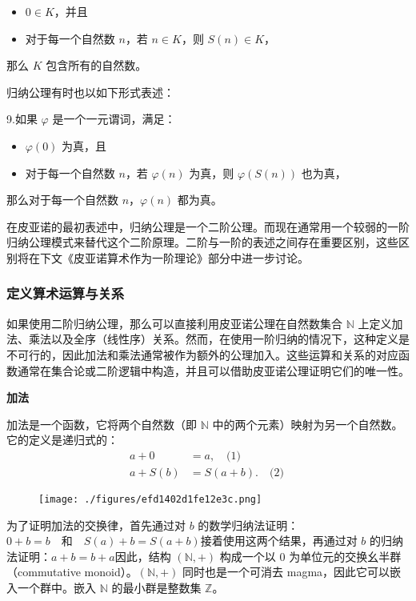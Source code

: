 \begin{itemize}
\item $0 \in K$，并且
\item 对于每一个自然数 $n$，若 $n \in K$，则 $S(n) \in K$，
\end{itemize}

那么 $K$ 包含所有的自然数。

归纳公理有时也以如下形式表述：

9.如果 $\varphi$ 是一个一元谓词，满足：

\begin{itemize}
\item $\varphi(0)$ 为真，且
\item 对于每一个自然数 $n$，若 $\varphi(n)$ 为真，则 $\varphi(S(n))$ 也为真，
\end{itemize}
那么对于每一个自然数 $n$，$\varphi(n)$ 都为真。

在皮亚诺的最初表述中，归纳公理是一个二阶公理。而现在通常用一个较弱的一阶归纳公理模式来替代这个二阶原理。二阶与一阶的表述之间存在重要区别，这些区别将在下文《皮亚诺算术作为一阶理论》部分中进一步讨论。
\subsubsection{定义算术运算与关系}
如果使用二阶归纳公理，那么可以直接利用皮亚诺公理在自然数集合 $\mathbb{N}$ 上定义加法、乘法以及全序（线性序）关系。然而，在使用一阶归纳的情况下，这种定义是不可行的，因此加法和乘法通常被作为额外的公理加入。这些运算和关系的对应函数通常在集合论或二阶逻辑中构造，并且可以借助皮亚诺公理证明它们的唯一性。

\textbf{加法}

加法是一个函数，它将两个自然数（即 $\mathbb{N}$ 中的两个元素）映射为另一个自然数。它的定义是递归式的：
$$
\begin{aligned}
a + 0 &= a, \quad \text{(1)} \\
a + S(b) &= S(a + b). \quad \text{(2)}
\end{aligned}~
$$
\begin{figure}[ht]
\centering
\texttt{[image: ./figures/efd1402d1fe12e3c.png]}
\caption{} \label{fig_PYN_3}
\end{figure}
为了证明加法的交换律，首先通过对 $b$ 的数学归纳法证明：$0 + b = b \quad \text{和} \quad S(a) + b = S(a + b)$接着使用这两个结果，再通过对 $b$ 的归纳法证明：$a + b = b + a$因此，结构 $(\mathbb{N}, +)$ 构成一个以 0 为单位元的交换幺半群（commutative monoid）。$(\mathbb{N}, +)$ 同时也是一个可消去 magma，因此它可以嵌入一个群中。嵌入 $\mathbb{N}$ 的最小群是整数集 $\mathbb{Z}$。

